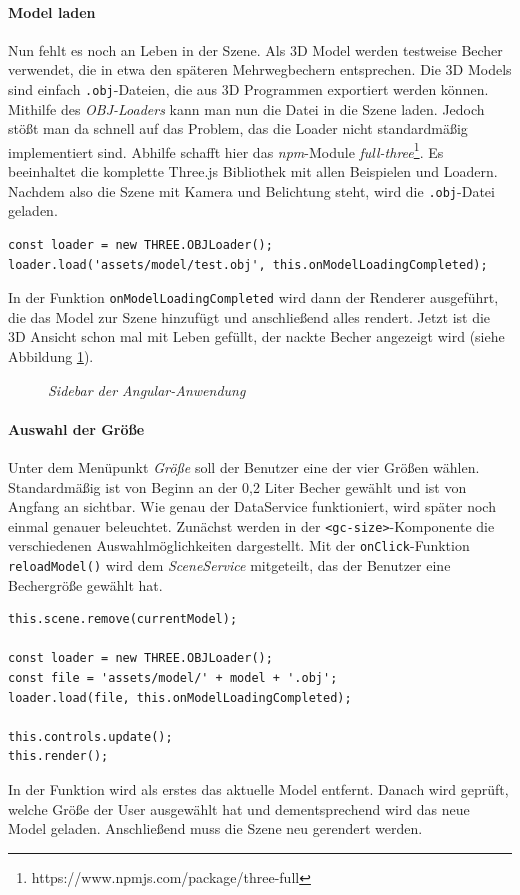 \paragraph{Model laden} Nun fehlt es noch an Leben in der Szene. Als 3D Model werden testweise Becher verwendet, die in etwa den späteren Mehrwegbechern entsprechen. Die 3D Models sind einfach \texttt{.obj}-Dateien, die aus 3D Programmen exportiert werden können. Mithilfe des \textit{OBJ-Loaders} kann man nun die Datei in die Szene laden. Jedoch stößt man da schnell auf das Problem, das die Loader nicht standardmäßig implementiert sind. Abhilfe schafft hier das \textit{npm}-Module \textit{full-three}\footnote{https://www.npmjs.com/package/three-full}. Es beeinhaltet die komplette Three.js Bibliothek mit allen Beispielen und Loadern. Nachdem also die Szene mit Kamera und Belichtung steht, wird die \texttt{.obj}-Datei geladen.
%
\begin{lstlisting}
const loader = new THREE.OBJLoader();
loader.load('assets/model/test.obj', this.onModelLoadingCompleted);
\end{lstlisting}
%
In der Funktion \texttt{onModelLoadingCompleted} wird dann der Renderer ausgeführt, die das Model zur Szene hinzufügt und anschließend alles rendert. Jetzt ist die 3D Ansicht schon mal mit Leben gefüllt, der nackte Becher angezeigt wird (siehe Abbildung \ref{fig:3dmodel}).
\begin{figure}[h]
	\centering
	{}
	\caption[Komponentendiagramm]{\textit{Sidebar der Angular-Anwendung}}
	\label{fig:3dmodel}
\end{figure}
\paragraph{Auswahl der Größe}
Unter dem Menüpunkt \textit{\glqq Größe\grqq} soll der Benutzer eine der vier Größen wählen. Standardmäßig ist von Beginn an der 0,2 Liter Becher gewählt und ist von Angfang an sichtbar. Wie genau der DataService funktioniert, wird später noch einmal genauer beleuchtet. Zunächst werden in der \texttt{<gc-size>}-Komponente die verschiedenen Auswahlmöglichkeiten dargestellt. Mit der \texttt{onClick}-Funktion \texttt{reloadModel()} wird dem \textit{SceneService} mitgeteilt, das der Benutzer eine Bechergröße gewählt hat. 
%
\begin{lstlisting}
this.scene.remove(currentModel);

const loader = new THREE.OBJLoader();
const file = 'assets/model/' + model + '.obj';
loader.load(file, this.onModelLoadingCompleted);

this.controls.update();
this.render();
\end{lstlisting}
%
In der Funktion wird als erstes das aktuelle Model entfernt. Danach wird geprüft, welche Größe der User ausgewählt hat und dementsprechend wird das neue Model geladen. Anschließend muss die Szene neu gerendert werden. 
